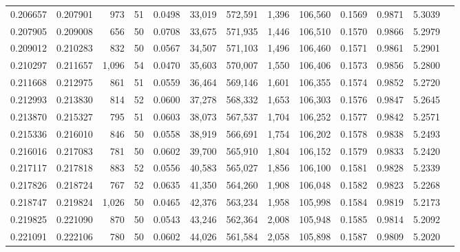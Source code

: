 \begin{tabular}{rrrrrrrrrrrrr}
0.206657 & 0.207901 &   973 &  51 &                                     0.0498 &  33,019 & 572,591 &   1,396 & 106,560 & 0.1569 & 0.9871 & 5.3039 \\
0.207905 & 0.209008 &   656 &  50 &                                     0.0708 &  33,675 & 571,935 &   1,446 & 106,510 & 0.1570 & 0.9866 & 5.2979 \\
0.209012 & 0.210283 &   832 &  50 &                                     0.0567 &  34,507 & 571,103 &   1,496 & 106,460 & 0.1571 & 0.9861 & 5.2901 \\
0.210297 & 0.211657 & 1,096 &  54 &                                     0.0470 &  35,603 & 570,007 &   1,550 & 106,406 & 0.1573 & 0.9856 & 5.2800 \\
0.211668 & 0.212975 &   861 &  51 &                                     0.0559 &  36,464 & 569,146 &   1,601 & 106,355 & 0.1574 & 0.9852 & 5.2720 \\
0.212993 & 0.213830 &   814 &  52 &                                     0.0600 &  37,278 & 568,332 &   1,653 & 106,303 & 0.1576 & 0.9847 & 5.2645 \\
0.213870 & 0.215327 &   795 &  51 &                                     0.0603 &  38,073 & 567,537 &   1,704 & 106,252 & 0.1577 & 0.9842 & 5.2571 \\
0.215336 & 0.216010 &   846 &  50 &                                     0.0558 &  38,919 & 566,691 &   1,754 & 106,202 & 0.1578 & 0.9838 & 5.2493 \\
0.216016 & 0.217083 &   781 &  50 &                                     0.0602 &  39,700 & 565,910 &   1,804 & 106,152 & 0.1579 & 0.9833 & 5.2420 \\
0.217117 & 0.217818 &   883 &  52 &                                     0.0556 &  40,583 & 565,027 &   1,856 & 106,100 & 0.1581 & 0.9828 & 5.2339 \\
0.217826 & 0.218724 &   767 &  52 &                                     0.0635 &  41,350 & 564,260 &   1,908 & 106,048 & 0.1582 & 0.9823 & 5.2268 \\
0.218747 & 0.219824 & 1,026 &  50 &                                     0.0465 &  42,376 & 563,234 &   1,958 & 105,998 & 0.1584 & 0.9819 & 5.2173 \\
0.219825 & 0.221090 &   870 &  50 &                                     0.0543 &  43,246 & 562,364 &   2,008 & 105,948 & 0.1585 & 0.9814 & 5.2092 \\
0.221091 & 0.222106 &   780 &  50 &                                     0.0602 &  44,026 & 561,584 &   2,058 & 105,898 & 0.1587 & 0.9809 & 5.2020 \\

\end{tabular}
